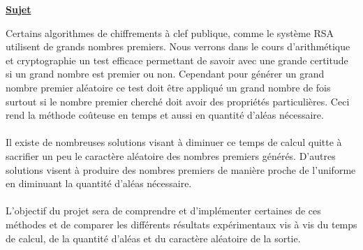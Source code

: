 \begin{center}
    \Huge \underline{\textbf{Sujet}}
\end{center}
Certains algorithmes de chiffrements à clef publique, comme le système RSA utilisent de grands nombres premiers. Nous verrons dans le cours d’arithmétique et cryptographie un test efficace permettant de savoir avec une grande certitude si un grand nombre est premier ou non. Cependant pour générer un grand nombre premier aléatoire ce test doit être appliqué un grand nombre de fois surtout si le nombre premier cherché doit avoir des propriétés particulières. Ceci rend la méthode coûteuse en temps et aussi en quantité d’aléas nécessaire. \\ \\
Il existe de nombreuses solutions visant à diminuer ce temps de calcul quitte à sacrifier un peu le caractère aléatoire des nombres premiers générés. D’autres solutions visent à produire des nombres premiers de manière proche de l’uniforme en diminuant la quantité d’aléas nécessaire.\\ \\
L’objectif du projet sera de comprendre et d’implémenter certaines de ces méthodes et de comparer les différents résultats expérimentaux vis à vis du temps de calcul, de la quantité d’aléas et du caractère aléatoire de la sortie.

